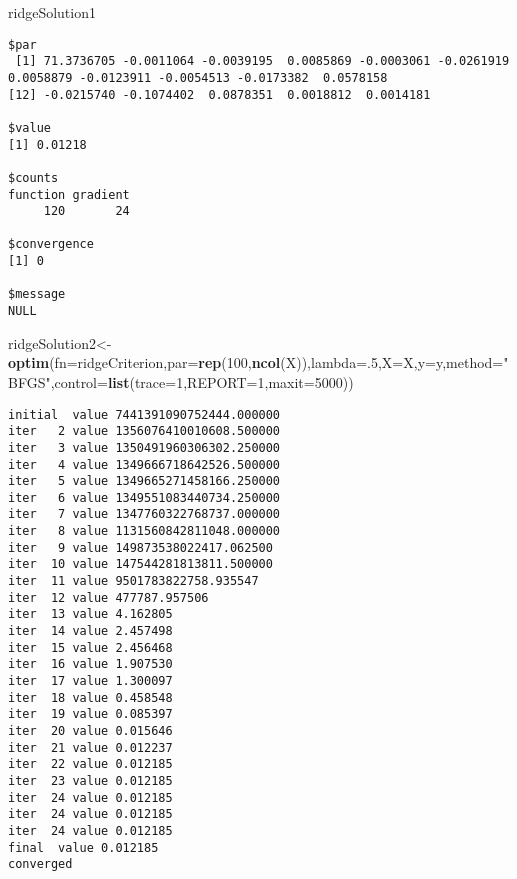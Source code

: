 \documentclass[10pt,]{article}
\newenvironment{Shaded}{\begin{snugshade}}{\end{snugshade}}
\newcommand{\KeywordTok}[1]{\textcolor[rgb]{0.13,0.29,0.53}{\textbf{{#1}}}}
\newcommand{\DataTypeTok}[1]{\textcolor[rgb]{0.13,0.29,0.53}{{#1}}}
\newcommand{\DecValTok}[1]{\textcolor[rgb]{0.00,0.00,0.81}{{#1}}}
\newcommand{\StringTok}[1]{\textcolor[rgb]{0.31,0.60,0.02}{{#1}}}
\newcommand{\NormalTok}[1]{{#1}}
\begin{document}
\begin{Shaded}
\begin{Highlighting}[]
\NormalTok{ridgeSolution1}
\end{Highlighting}
\end{Shaded}

\begin{verbatim}
$par
 [1] 71.3736705 -0.0011064 -0.0039195  0.0085869 -0.0003061 -0.0261919  0.0058879 -0.0123911 -0.0054513 -0.0173382  0.0578158
[12] -0.0215740 -0.1074402  0.0878351  0.0018812  0.0014181

$value
[1] 0.01218

$counts
function gradient 
     120       24 

$convergence
[1] 0

$message
NULL
\end{verbatim}

\begin{Shaded}
\begin{Highlighting}[]
\NormalTok{ridgeSolution2<-}\KeywordTok{optim}\NormalTok{(}\DataTypeTok{fn=}\NormalTok{ridgeCriterion,}\DataTypeTok{par=}\KeywordTok{rep}\NormalTok{(}\DecValTok{100}\NormalTok{,}\KeywordTok{ncol}\NormalTok{(X)),}\DataTypeTok{lambda=}\NormalTok{.}\DecValTok{5}\NormalTok{,}\DataTypeTok{X=}\NormalTok{X,}\DataTypeTok{y=}\NormalTok{y,}\DataTypeTok{method=}\StringTok{"BFGS"}\NormalTok{,}\DataTypeTok{control=}\KeywordTok{list}\NormalTok{(}\DataTypeTok{trace=}\DecValTok{1}\NormalTok{,}\DataTypeTok{REPORT=}\DecValTok{1}\NormalTok{,}\DataTypeTok{maxit=}\DecValTok{5000}\NormalTok{))}
\end{Highlighting}
\end{Shaded}

\begin{verbatim}
initial  value 7441391090752444.000000 
iter   2 value 1356076410010608.500000
iter   3 value 1350491960306302.250000
iter   4 value 1349666718642526.500000
iter   5 value 1349665271458166.250000
iter   6 value 1349551083440734.250000
iter   7 value 1347760322768737.000000
iter   8 value 1131560842811048.000000
iter   9 value 149873538022417.062500
iter  10 value 147544281813811.500000
iter  11 value 9501783822758.935547
iter  12 value 477787.957506
iter  13 value 4.162805
iter  14 value 2.457498
iter  15 value 2.456468
iter  16 value 1.907530
iter  17 value 1.300097
iter  18 value 0.458548
iter  19 value 0.085397
iter  20 value 0.015646
iter  21 value 0.012237
iter  22 value 0.012185
iter  23 value 0.012185
iter  24 value 0.012185
iter  24 value 0.012185
iter  24 value 0.012185
final  value 0.012185 
converged
\end{verbatim}
\end{document}
